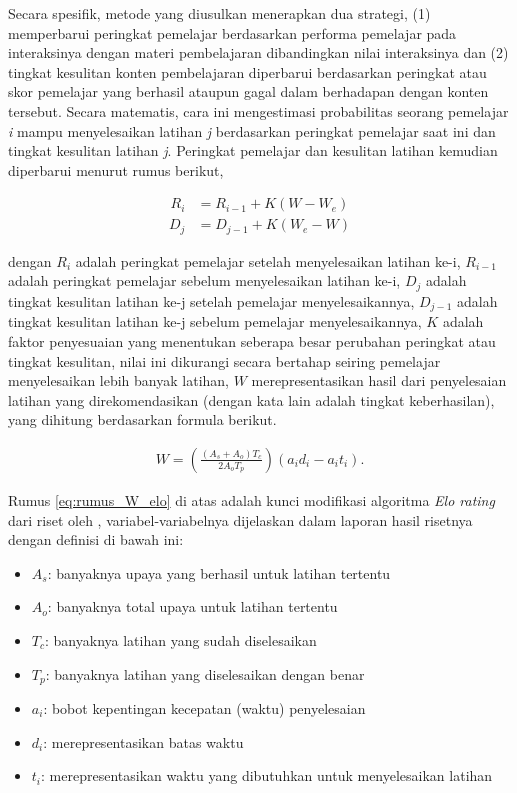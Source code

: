 Secara spesifik, metode yang diusulkan menerapkan dua strategi, (1) memperbarui peringkat pemelajar
berdasarkan performa pemelajar pada interaksinya dengan materi pembelajaran dibandingkan nilai interaksinya dan (2)
tingkat kesulitan konten pembelajaran diperbarui berdasarkan peringkat atau skor pemelajar yang berhasil ataupun gagal dalam berhadapan dengan konten tersebut. Secara matematis, cara ini mengestimasi probabilitas seorang pemelajar \textit{i} mampu menyelesaikan latihan \textit{j} berdasarkan peringkat pemelajar saat ini dan tingkat kesulitan latihan \textit{j}.
Peringkat pemelajar dan kesulitan latihan kemudian diperbarui menurut rumus berikut,

\begin{align}
R_i &= R_{i-1} + K (W - W_e)\label{eq:rumus_elo_student}
\end{align}
\begin{align}
D_j &= D_{j-1} + K (W_e - W)\label{eq:rumus_elo_latihan}
\end{align}

dengan $R_i$ adalah peringkat pemelajar setelah menyelesaikan latihan ke-i,
$R_{i-1}$ adalah peringkat pemelajar sebelum menyelesaikan latihan ke-i,
$D_j$ adalah tingkat kesulitan latihan ke-j setelah pemelajar menyelesaikannya,
$D_{j-1}$ adalah tingkat kesulitan latihan ke-j sebelum pemelajar menyelesaikannya,
$K$ adalah faktor penyesuaian yang menentukan seberapa besar perubahan peringkat
atau tingkat kesulitan, nilai ini dikurangi secara bertahap seiring pemelajar menyelesaikan lebih banyak latihan,
$W$ merepresentasikan hasil dari penyelesaian latihan yang direkomendasikan (dengan kata lain adalah tingkat keberhasilan),
yang dihitung berdasarkan formula berikut.

\begin{align}
W = \left(\frac{(A_s + A_o)T_c}{2A_oT_p}\right)(a_id_i - a_it_i). \label{eq:rumus_W_elo}
\end{align}

Rumus \ref{eq:rumus_W_elo} di atas adalah kunci modifikasi algoritma \textit{Elo rating} dari riset oleh \textcite{Vesin2022},
variabel-variabelnya dijelaskan dalam laporan hasil risetnya dengan definisi di bawah ini:
\begin{itemize}
    \item $A_s$: banyaknya upaya yang berhasil untuk latihan tertentu
    \item $A_o$: banyaknya total upaya untuk latihan tertentu
    \item $T_c$: banyaknya latihan yang sudah diselesaikan
    \item $T_p$: banyaknya latihan yang diselesaikan dengan benar
    \item $a_i$: bobot kepentingan kecepatan (waktu) penyelesaian
    \item $d_i$: merepresentasikan batas waktu
    \item $t_i$: merepresentasikan waktu yang dibutuhkan untuk menyelesaikan latihan
\end{itemize}

